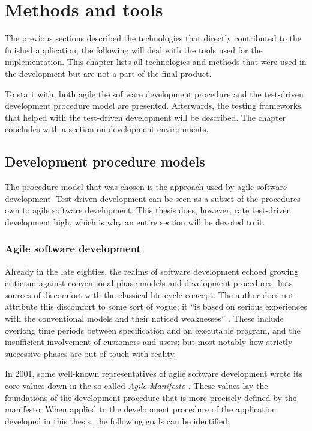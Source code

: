 \section{Methods and tools}
\label{sec:werkzeuge}

The previous sections described the technologies that directly contributed to the finished application; the following will deal with the tools used for the implementation. This chapter lists all technologies and methods that were used in the development but are not a part of the final product.

To start with, both agile the software development procedure and the test-driven development procedure model are presented. Afterwards, the testing frameworks that helped with the test-driven development will be described. The chapter concludes with a section on development environments.

 
\subsection{Development procedure models}

The procedure model that was chosen is the approach used by agile software development. Test-driven development can be seen as a subset of the procedures own to agile software development. This thesis does, however, rate test-driven development high, which is why an entire section will be devoted to it.

\subsubsection{Agile software development}

Already in the late eighties, the realms of software development echoed growing criticism against conventional phase models and development procedures.  lists sources of discomfort with the classical life cycle concept. The author does not attribute this discomfort to some sort of vogue; it \enquote{is based on serious experiences with the conventional models and their noticed weaknesses} . These include overlong time periods between specification and an executable program, and the insufficient involvement of customers and users; but most notably how strictly successive phases are out of touch with reality.

In 2001, some well-known representatives of agile software development wrote its core values down in the so-called \textit{Agile Manifesto} \cite{agile:manifesto}. These values lay the foundations of the development procedure that is more precisely defined by the manifesto. When applied to the development procedure of the application developed in this thesis, the following goals can be identified:

